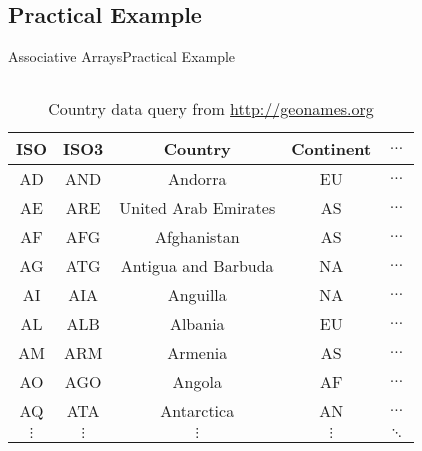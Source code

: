 
\subsection{Practical Example}

\begin{frame}{Associative Arrays}{Practical Example}
  \vspace{-2.0em}
  \begin{columns}
    \begin{column}{0.9\textwidth}
      \begin{table}[!t]
        \label{tab:extended_sorting:country_query}
        \caption{Country data query from \url{http://geonames.org}}
        \begin{tabular}{ccccc}
          ISO & ISO3 & Country & Continent & $\dots$\\
          \midrule
          AD & AND & Andorra & EU & $\dots$\\
          AE & ARE & United Arab Emirates & AS & $\dots$\\
          AF & AFG & Afghanistan & AS & $\dots$\\
          AG & ATG & Antigua and Barbuda & NA & $\dots$\\
          AI & AIA & Anguilla & NA & $\dots$\\
          AL & ALB & Albania & EU & $\dots$\\
          AM & ARM & Armenia & AS & $\dots$\\
          AO & AGO & Angola & AF & $\dots$\\
          AQ & ATA & Antarctica & AN & $\dots$\\
          $\vdots$ & $\vdots$ & $\vdots$ & $\vdots$ & $\ddots$
        \end{tabular}
      \end{table}
    \end{column}
    \begin{column}{0.1\textwidth}
      \vspace{-6.0em}
      \\
    \end{column}
  \end{columns}
\end{frame}


